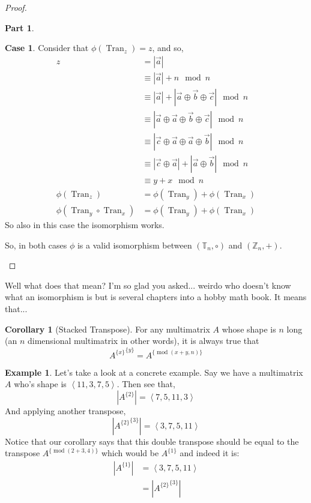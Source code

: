 \documentclass[12pt]{book}
\theoremstyle{plain}
\theoremstyle{definition}
\newtheorem{corollary}{Corollary}[theorem]
\newtheorem{example}{Example}[chapter]
\theoremstyle{ppart}
\newtheorem{ppart}{Part}
\theoremstyle{case}
\newtheorem{case}{Case}
\theoremstyle{solution}
\DeclareMathOperator{\Tran}{Tran}
\DeclareMathOperator{\remainder}{mod}
\newcommand{\shape}[1]{\left|#1\right|}
\newcommand{\transpose}[2]{{#1}^{\{#2\}}}
\begin{document}
\begin{proof}
\begin{ppart}
\begin{case}
Consider that $\phi(\Tran_z) = z$, and so,
\begin{align*}
  z
  &= \shape{\vec{a}} \\
  &\equiv \shape{\vec{a}} + n \mod n \\
  &\equiv \shape{\vec{a}} + \shape{\vec{a} \oplus \vec{b} \oplus \vec{c}} \mod n \\
  &\equiv \shape{\vec{a} \oplus \vec{a} \oplus \vec{b} \oplus \vec{c}} \mod n \\
  &\equiv \shape{\vec{c} \oplus \vec{a} \oplus \vec{a} \oplus \vec{b}} \mod n \\
  &\equiv \shape{\vec{c} \oplus \vec{a}} + \shape{\vec{a} \oplus \vec{b}} \mod n \\
  &\equiv y + x \mod n \\
  \phi(\Tran_z) &= \phi(\Tran_y) + \phi(\Tran_x) \\
  \phi(\Tran_y \circ \Tran_x) &= \phi(\Tran_y) + \phi(\Tran_x)
\end{align*}
So also in this case the isomorphism works.
\end{case}

So, in both cases $\phi$ is a valid isomorphism between $(\mathbb{T}_n, \circ)$
and $(\mathbb{Z}_n, +)$.
\end{ppart}
\end{proof}

Well what does that mean? I'm so glad you asked... weirdo who doesn't know what
an isomorphism is but is several chapters into a hobby math book. It means that...

\begin{corollary}[Stacked Transpose]
For any multimatrix $A$ whose shape is $n$ long (an $n$ dimensional multimatrix
in other words), it is always true that
\[ \transpose{\transpose{A}{x}}{y} = \transpose{A}{\remainder(x+y,n)} \]
\end{corollary}

\begin{example}
Let's take a look at a concrete example. Say we have a
multimatrix $A$ who's shape is $\left<11, 3, 7, 5\right>$. 
Then see that,
\[ \shape{\transpose{A}{2}} = \left<7, 5, 11, 3\right> \]
And applying another transpose,
\[ \shape{\transpose{\transpose{A}{2}}{3}} = \left<3, 7, 5, 11\right> \]
Notice that our corollary says that this double transpose should be
equal to the transpose $\transpose{A}{\remainder(2+3, 4)}$ which would
be $\transpose{A}{1}$ and indeed it is:
\begin{align*}
  \shape{\transpose{A}{1}}
  &= \left<3, 7, 5, 11\right> \\
  &= \shape{\transpose{\transpose{A}{2}}{3}}
\end{align*}
\end{example}
\end{document}

